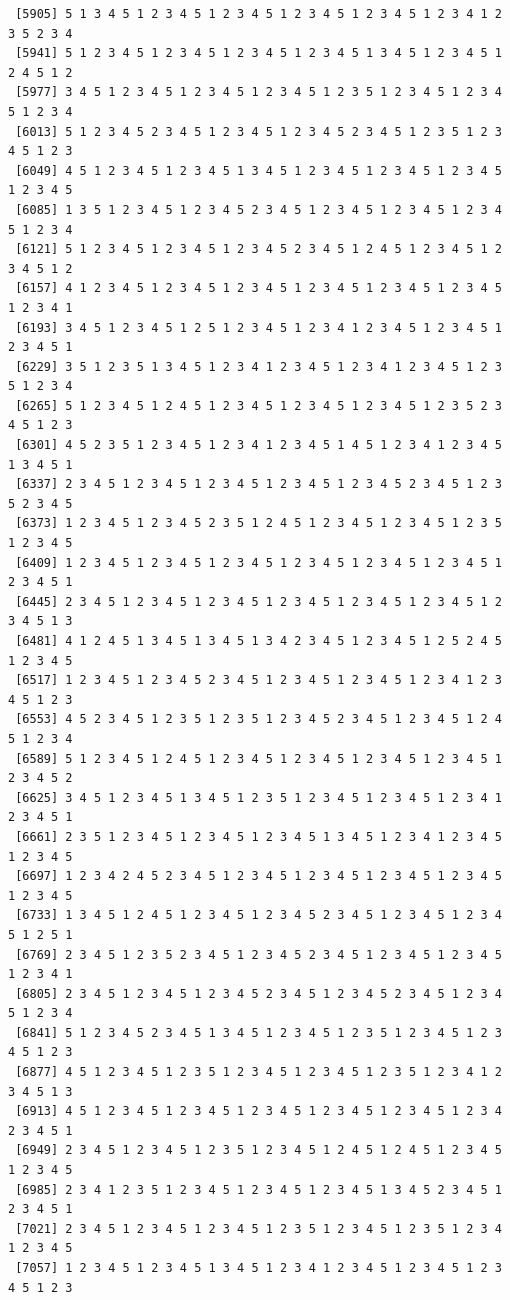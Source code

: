 \documentclass[
  11pt,
]{book}
\begin{document}
\begin{verbatim}
 [5905] 5 1 3 4 5 1 2 3 4 5 1 2 3 4 5 1 2 3 4 5 1 2 3 4 5 1 2 3 4 1 2 3 5 2 3 4
 [5941] 5 1 2 3 4 5 1 2 3 4 5 1 2 3 4 5 1 2 3 4 5 1 3 4 5 1 2 3 4 5 1 2 4 5 1 2
 [5977] 3 4 5 1 2 3 4 5 1 2 3 4 5 1 2 3 4 5 1 2 3 5 1 2 3 4 5 1 2 3 4 5 1 2 3 4
 [6013] 5 1 2 3 4 5 2 3 4 5 1 2 3 4 5 1 2 3 4 5 2 3 4 5 1 2 3 5 1 2 3 4 5 1 2 3
 [6049] 4 5 1 2 3 4 5 1 2 3 4 5 1 3 4 5 1 2 3 4 5 1 2 3 4 5 1 2 3 4 5 1 2 3 4 5
 [6085] 1 3 5 1 2 3 4 5 1 2 3 4 5 2 3 4 5 1 2 3 4 5 1 2 3 4 5 1 2 3 4 5 1 2 3 4
 [6121] 5 1 2 3 4 5 1 2 3 4 5 1 2 3 4 5 2 3 4 5 1 2 4 5 1 2 3 4 5 1 2 3 4 5 1 2
 [6157] 4 1 2 3 4 5 1 2 3 4 5 1 2 3 4 5 1 2 3 4 5 1 2 3 4 5 1 2 3 4 5 1 2 3 4 1
 [6193] 3 4 5 1 2 3 4 5 1 2 5 1 2 3 4 5 1 2 3 4 1 2 3 4 5 1 2 3 4 5 1 2 3 4 5 1
 [6229] 3 5 1 2 3 5 1 3 4 5 1 2 3 4 1 2 3 4 5 1 2 3 4 1 2 3 4 5 1 2 3 5 1 2 3 4
 [6265] 5 1 2 3 4 5 1 2 4 5 1 2 3 4 5 1 2 3 4 5 1 2 3 4 5 1 2 3 5 2 3 4 5 1 2 3
 [6301] 4 5 2 3 5 1 2 3 4 5 1 2 3 4 1 2 3 4 5 1 4 5 1 2 3 4 1 2 3 4 5 1 3 4 5 1
 [6337] 2 3 4 5 1 2 3 4 5 1 2 3 4 5 1 2 3 4 5 1 2 3 4 5 2 3 4 5 1 2 3 5 2 3 4 5
 [6373] 1 2 3 4 5 1 2 3 4 5 2 3 5 1 2 4 5 1 2 3 4 5 1 2 3 4 5 1 2 3 5 1 2 3 4 5
 [6409] 1 2 3 4 5 1 2 3 4 5 1 2 3 4 5 1 2 3 4 5 1 2 3 4 5 1 2 3 4 5 1 2 3 4 5 1
 [6445] 2 3 4 5 1 2 3 4 5 1 2 3 4 5 1 2 3 4 5 1 2 3 4 5 1 2 3 4 5 1 2 3 4 5 1 3
 [6481] 4 1 2 4 5 1 3 4 5 1 3 4 5 1 3 4 2 3 4 5 1 2 3 4 5 1 2 5 2 4 5 1 2 3 4 5
 [6517] 1 2 3 4 5 1 2 3 4 5 2 3 4 5 1 2 3 4 5 1 2 3 4 5 1 2 3 4 1 2 3 4 5 1 2 3
 [6553] 4 5 2 3 4 5 1 2 3 5 1 2 3 5 1 2 3 4 5 2 3 4 5 1 2 3 4 5 1 2 4 5 1 2 3 4
 [6589] 5 1 2 3 4 5 1 2 4 5 1 2 3 4 5 1 2 3 4 5 1 2 3 4 5 1 2 3 4 5 1 2 3 4 5 2
 [6625] 3 4 5 1 2 3 4 5 1 3 4 5 1 2 3 5 1 2 3 4 5 1 2 3 4 5 1 2 3 4 1 2 3 4 5 1
 [6661] 2 3 5 1 2 3 4 5 1 2 3 4 5 1 2 3 4 5 1 3 4 5 1 2 3 4 1 2 3 4 5 1 2 3 4 5
 [6697] 1 2 3 4 2 4 5 2 3 4 5 1 2 3 4 5 1 2 3 4 5 1 2 3 4 5 1 2 3 4 5 1 2 3 4 5
 [6733] 1 3 4 5 1 2 4 5 1 2 3 4 5 1 2 3 4 5 2 3 4 5 1 2 3 4 5 1 2 3 4 5 1 2 5 1
 [6769] 2 3 4 5 1 2 3 5 2 3 4 5 1 2 3 4 5 2 3 4 5 1 2 3 4 5 1 2 3 4 5 1 2 3 4 1
 [6805] 2 3 4 5 1 2 3 4 5 1 2 3 4 5 2 3 4 5 1 2 3 4 5 2 3 4 5 1 2 3 4 5 1 2 3 4
 [6841] 5 1 2 3 4 5 2 3 4 5 1 3 4 5 1 2 3 4 5 1 2 3 5 1 2 3 4 5 1 2 3 4 5 1 2 3
 [6877] 4 5 1 2 3 4 5 1 2 3 5 1 2 3 4 5 1 2 3 4 5 1 2 3 5 1 2 3 4 1 2 3 4 5 1 3
 [6913] 4 5 1 2 3 4 5 1 2 3 4 5 1 2 3 4 5 1 2 3 4 5 1 2 3 4 5 1 2 3 4 2 3 4 5 1
 [6949] 2 3 4 5 1 2 3 4 5 1 2 3 5 1 2 3 4 5 1 2 4 5 1 2 4 5 1 2 3 4 5 1 2 3 4 5
 [6985] 2 3 4 1 2 3 5 1 2 3 4 5 1 2 3 4 5 1 2 3 4 5 1 3 4 5 2 3 4 5 1 2 3 4 5 1
 [7021] 2 3 4 5 1 2 3 4 5 1 2 3 4 5 1 2 3 5 1 2 3 4 5 1 2 3 5 1 2 3 4 1 2 3 4 5
 [7057] 1 2 3 4 5 1 2 3 4 5 1 3 4 5 1 2 3 4 1 2 3 4 5 1 2 3 4 5 1 2 3 4 5 1 2 3

\end{verbatim}
\end{document}
